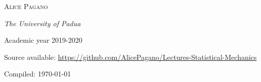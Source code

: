 \begin{titlepage}
	{\scshape\Large Alice Pagano \\} %
	
	\vspace{0.5\baselineskip} %
	
	\textit{The University of Padua } %
	
	\vspace{0.5\baselineskip}
	
	\small Academic year 2019-2020
	
	\vspace{4cm}
	
	Source available: \url{https://github.com/AlicePagano/Lectures-Statistical-Mechanics}
	\vspace{2cm}
	
	\footnotesize Compiled: \today %
	
	\vfill %
	
%	
%	
%	
%	

\end{titlepage}

\clearpage{\pagestyle{empty}\cleardoublepage}
